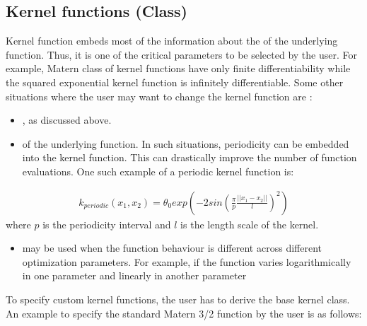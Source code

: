\documentclass[letterpaper,12pt,english]{sphinxmanual}
\begin{document}
\subsection{Kernel functions (Class)}
\label{\detokenize{examples/user_defined_function_example:kernel-functions-class}}\label{\detokenize{examples/user_defined_function_example:ex1-kernel}}
\sphinxAtStartPar
Kernel function embeds most of the information about the  of the underlying function. Thus, it is one of the
critical parameters to be selected by the user. For example, Matern class of kernel functions have only finite
differentiability while the squared exponential kernel function is infinitely differentiable. Some other situations
where the user may want to change the kernel function are :
\begin{itemize}
\item {} 
\sphinxAtStartPar
{}, as discussed above.

\item {} 
\sphinxAtStartPar
{} of the underlying function. In such situations, periodicity can be embedded
into the kernel function. This can drastically improve the number of function evaluations. One such example of a
periodic kernel function is:

\end{itemize}
\begin{equation*}
\begin{split}k_{periodic}(x_1, x_2) = \theta_0 exp(-2 sin(\frac{\pi}{p} \frac{||x_1 - x_2||}{l})^2)\end{split}
\end{equation*}
\sphinxAtStartPar
where \(p\) is the periodicity interval and \(l\) is the length scale of the kernel.
\begin{itemize}
\item {} 
\sphinxAtStartPar
{} may be used when the function behaviour is different across different optimization parameters.
For example, if the function varies logarithmically in one parameter and linearly in another parameter

\end{itemize}

\sphinxAtStartPar
To specify custom kernel functions, the user has to derive the base kernel class. An example to specify the standard
Matern 3/2 function by the user is as follows:
\end{document}
